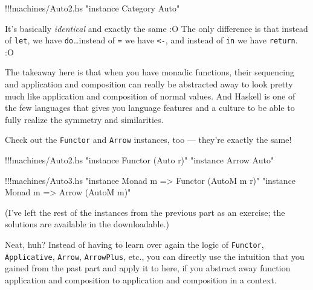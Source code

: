 \documentclass[]{article}
\newenvironment{Shaded}{}{}
\newcommand{\StringTok}[1]{\textcolor[rgb]{0.25,0.44,0.63}{{#1}}}
\newcommand{\FunctionTok}[1]{\textcolor[rgb]{0.02,0.16,0.49}{{#1}}}
\newcommand{\NormalTok}[1]{{#1}}
\begin{document}
\begin{Shaded}
\begin{Highlighting}[]
\FunctionTok{!!!}\NormalTok{machines}\FunctionTok{/}\NormalTok{Auto2.hs }\StringTok{"instance Category Auto"}
\end{Highlighting}
\end{Shaded}

It's basically \emph{identical} and exactly the same :O The only
difference is that instead of \texttt{let}, we have
\texttt{do}\ldots{}instead of \texttt{=} we have \texttt{\textless{}-},
and instead of \texttt{in} we have \texttt{return}. :O

The takeaway here is that when you have monadic functions, their
sequencing and application and composition can really be abstracted away
to look pretty much like application and composition of normal values.
And Haskell is one of the few languages that gives you language features
and a culture to be able to fully realize the symmetry and similarities.

Check out the \texttt{Functor} and \texttt{Arrow} instances, too ---
they're exactly the same!

\begin{Shaded}
\begin{Highlighting}[]
\FunctionTok{!!!}\NormalTok{machines}\FunctionTok{/}\NormalTok{Auto2.hs }\StringTok{"instance Functor (Auto r)"} \StringTok{"instance Arrow Auto"}
\end{Highlighting}
\end{Shaded}

\begin{Shaded}
\begin{Highlighting}[]
\FunctionTok{!!!}\NormalTok{machines}\FunctionTok{/}\NormalTok{Auto3.hs }\StringTok{"instance Monad m => Functor (AutoM m r)"} \StringTok{"instance Monad m => Arrow (AutoM m)"}
\end{Highlighting}
\end{Shaded}

(I've left the rest of the instances from the previous part as an
exercise; the solutions are available in the downloadable.)

Neat, huh? Instead of having to learn over again the logic of
\texttt{Functor}, \texttt{Applicative}, \texttt{Arrow},
\texttt{ArrowPlus}, etc., you can directly use the intuition that you
gained from the past part and apply it to here, if you abstract away
function application and composition to application and composition in a
context.
\end{document}

